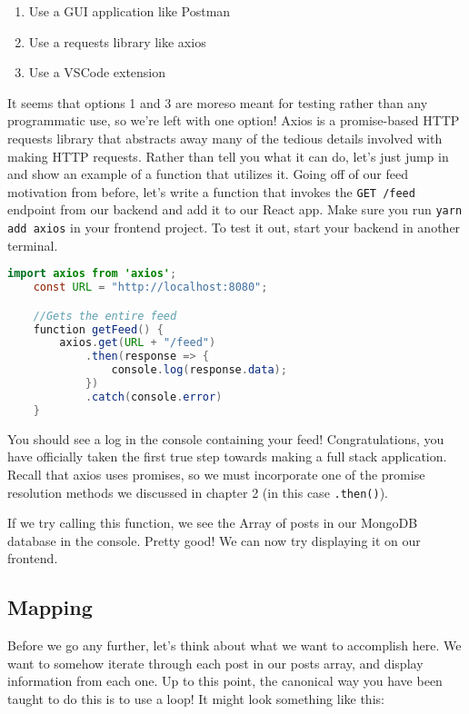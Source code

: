 \begin{enumerate}
    \item Use a GUI application like Postman
    \item Use a requests library like axios
    \item Use a VSCode extension
\end{enumerate}

It seems that options 1 and 3 are moreso meant for testing rather than any programmatic use, so we're left with one option! Axios is a promise-based HTTP requests library that abstracts away many of the tedious details involved with making HTTP requests. Rather than tell you what it can do, let's just jump in and show an example of a function that utilizes it. Going off of our feed motivation from before, let's write a function that invokes the \texttt{GET /feed} endpoint from our backend and add it to our React app. Make sure you run \texttt{yarn add axios} in your frontend project. To test it out, start your backend in another terminal.

\begin{lstlisting}[language=Java]
    import axios from 'axios';
    const URL = "http://localhost:8080";

    //Gets the entire feed
    function getFeed() {
        axios.get(URL + "/feed")
            .then(response => { 
                console.log(response.data);
            })
            .catch(console.error)
    }
\end{lstlisting}

You should see a log in the console containing your feed! Congratulations, you have officially taken the first true step towards making a full stack application. Recall that axios uses promises, so we must incorporate one of the promise resolution methods we discussed in chapter 2 (in this case \texttt{.then()}). 

If we try calling this function, we see the Array of posts in our MongoDB database in the console. Pretty good! We can now try displaying it on our frontend. 

\subsection*{Mapping}

Before we go any further, let's think about what we want to accomplish here. We want to somehow iterate through each post in our posts array, and display information from each one. Up to this point, the canonical way you have been taught to do this is to use a loop! It might look something like this:

